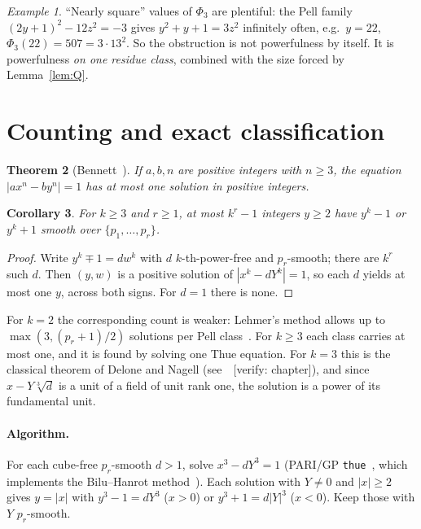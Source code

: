 \documentclass[11pt]{article}
\newtheorem{theorem}{Theorem}[section]
\newtheorem{corollary}[theorem]{Corollary}
\theoremstyle{definition}
\theoremstyle{remark}
\newtheorem{example}[theorem]{Example}
\newcommand{\verify}[1]{{\color{red!70!black}\,[verify: #1]}}
\begin{document}
\begin{example}
``Nearly square'' values of $\Phi_3$ are plentiful: the Pell family
$(2y+1)^2-12z^2=-3$ gives $y^2+y+1=3z^2$ infinitely often, e.g.\ $y=22$,
$\Phi_3(22)=507=3\cdot13^2$. So the obstruction is not powerfulness by itself.
It is powerfulness \emph{on one residue class}, combined with the size forced by
Lemma~\ref{lem:Q}.
\end{example}

\section{Counting and exact classification}\label{sec:bennett}

\begin{theorem}[Bennett~\cite{Bennett}]\label{thm:bennett}
If $a,b,n$ are positive integers with $n\ge3$, the equation $|ax^n-by^n|=1$ has
at most one solution in positive integers.
\end{theorem}

\begin{corollary}\label{cor:count}
For $k\ge3$ and $r\ge1$, at most $k^r-1$ integers $y\ge2$ have $y^k-1$ or
$y^k+1$ smooth over $\{p_1,\dots,p_r\}$.
\end{corollary}
\begin{proof}
Write $y^k\mp1=dw^k$ with $d$ $k$-th-power-free and $p_r$-smooth; there are
$k^r$ such $d$. Then $(y,w)$ is a positive solution of $|x^k-dY^k|=1$, so each
$d$ yields at most one $y$, across both signs. For $d=1$ there is none.
\end{proof}

For $k=2$ the corresponding count is weaker: Lehmer's method allows up to
$\max(3,(p_r+1)/2)$ solutions per Pell class~\cite{Lehmer}. For $k\ge3$ each
class carries at most one, and it is found by solving one Thue equation. For
$k=3$ this is the classical theorem of Delone and Nagell (see~\cite{Mordell}
\verify{chapter}), and since $x-Y\sqrt[3]{d}$ is a unit of a field of unit rank one, the solution
is a power of its fundamental unit.

\paragraph{Algorithm.} For each cube-free $p_r$-smooth $d>1$, solve
$x^3-dY^3=1$ (PARI/GP \texttt{thue}~\cite{PARI}, which implements the
Bilu--Hanrot method~\cite{BiluHanrot}). Each solution with $Y\ne0$ and
$|x|\ge2$ gives $y=|x|$ with $y^3-1=dY^3$ ($x>0$) or $y^3+1=d|Y|^3$ ($x<0$).
Keep those with $Y$ $p_r$-smooth.
\end{document}
